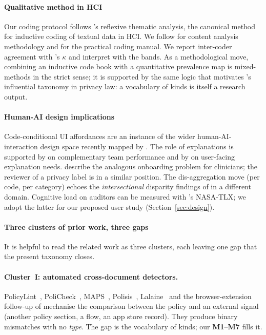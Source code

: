 \documentclass[11pt,a4paper]{article}
\newcommand{\code}[1]{\textsf{\textbf{#1}}}
\begin{document}
\paragraph{Qualitative method in HCI}
Our coding protocol follows \citet{braun2006using}'s reflexive thematic
analysis, the canonical method for inductive coding of textual data in
HCI. We follow \citet{krippendorff2018content} for content analysis
methodology and \citet{saldana2016coding} for the practical coding
manual. We report inter-coder agreement with
\citet{cohen1960coefficient}'s $\kappa$ and interpret with the
\citet{landis1977measurement} bands. As a methodological move,
combining an inductive code book with a quantitative prevalence map is
mixed-methods in the strict sense; it is supported by the same logic
that motivates \citet{solove2006taxonomy}'s influential taxonomy in
privacy law: a vocabulary of kinds is itself a research output.

\paragraph{Human-AI design implications}
Code-conditional UI affordances are an instance of the wider
human-AI-interaction design space recently mapped by
\citet{amershi2019guidelines}. The role of explanations is supported by
\citet{bansal2021does} on complementary team performance and by
\citet{liao2020questioning} on user-facing explanation needs.
\citet{cai2019hello} describe the analogous onboarding problem for
clinicians; the reviewer of a privacy label is in a similar position.
The dis-aggregation move (per code, per category) echoes the
\emph{intersectional} disparity findings of \citet{buolamwini2018gender}
in a different domain. Cognitive load on auditors can be measured with
\citet{hart2008measurement}'s NASA-TLX; we adopt the latter for our
proposed user study (Section~\ref{sec:design}).

\paragraph{Three clusters of prior work, three gaps}
It is helpful to read the related work as three clusters, each leaving
one gap that the present taxonomy closes.

\paragraph{Cluster~I: automated cross-document detectors.}
PolicyLint~\citep{andow2019policylint},
PoliCheck~\citep{andow2020policheck},
MAPS~\citep{zimmeck2019maps},
Polisis~\citep{harkous2018polisis},
Lalaine~\citep{xiao2023lalaine} and the browser-extension follow-up of
\citet{bui2023detection} mechanise the comparison between the policy
and an external signal (another policy section, a flow, an app store
record). They produce binary mismatches with no \emph{type}. The gap
is the vocabulary of kinds; our \code{M1}--\code{M7} fills it.
\end{document}
